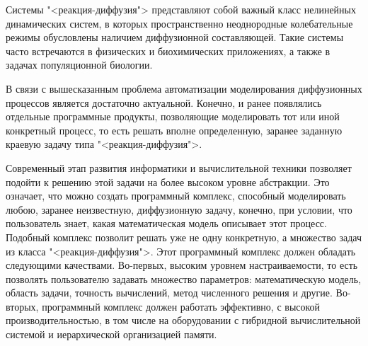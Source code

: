 \documentclass[a4paper, 14pt]{extarticle}
\theoremstyle{definition}
\begin{document}
\par Системы "<реакция-диффузия"> представляют собой важный класс нелинейных динамических систем, в которых пространственно неоднородные колебательные режимы обусловлены наличием диффузионной составляющей. Такие системы часто встречаются в физических и биохимических приложениях, а также в задачах популяционной биологии.



\par В связи с вышесказанным проблема автоматизации моделирования диффузионных процессов является достаточно актуальной. Конечно, и ранее появлялись отдельные программные продукты, позволяющие моделировать тот или иной конкретный процесс, то есть решать вполне определенную, заранее заданную краевую задачу типа "<реакция-диффузия">.

\par Современный этап развития информатики и вычислительной техники позволяет подойти к решению этой задачи на более высоком уровне абстракции. Это означает, что можно создать программный комплекс, способный моделировать любою, заранее неизвестную, диффузионную задачу, конечно, при условии, что пользователь знает, какая математическая модель описывает этот процесс. Подобный комплекс позволит решать уже не одну конкретную, а множество задач из класса "<реакция-диффузия">. Этот программный комплекс должен обладать следующими качествами. Во-первых, высоким уровнем настраиваемости, то есть позволять пользователю задавать множество параметров: математическую модель, область задачи, точность вычислений, метод численного решения и другие. Во-вторых, программный комплекс должен работать эффективно, с высокой производительностью, в том числе на оборудовании с гибридной вычислительной системой и иерархической организацией памяти.
\end{document}
